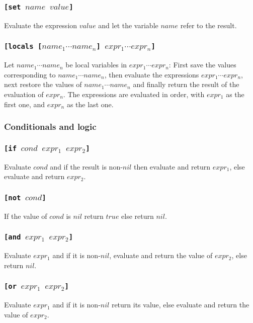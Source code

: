 \documentclass[11pt]{report}
\begin{document}
\subsubsection*{\tt{[set }$name$ $value$\tt{]}}
Evaluate the expression $value$ and let the variable $name$ refer to the result.

\subsubsection*{\tt{[locals [}$name_1 \cdots name_n$\tt{]} $expr_1 \cdots expr_n$\tt{]}}
Let $name_1 \cdots name_n$ be local variables in $expr_1 \cdots expr_n$: First save the values corresponding to $name_1 \cdots name_n$, then evaluate the expressions $expr_1 \cdots expr_n$, next restore the values of $name_1 \cdots name_n$ and finally return the result of the evaluation of $expr_n$. The expressions are evaluated in order, with $expr_1$ as the first one, and $expr_n$ as the last one.

\subsubsection{Conditionals and logic}
\subsubsection*{\tt{[if }$cond$ $expr_1$ $expr_2$\tt{]}}
Evaluate $cond$ and if the result is non-$nil$ then evaluate and return $expr_1$, else evaluate and return $expr_2$.

\subsubsection*{\tt{[not }$cond$\tt{]}}
If the value of $cond$ is $nil$ return $true$ else return $nil$.

\subsubsection*{\tt{[and }$expr_1$ $expr_2$\tt{]}}
Evaluate $expr_1$ and if it is non-$nil$, evaluate and return the value of $expr_2$, else return $nil$.

\subsubsection*{\tt{[or }$expr_1$ $expr_2$\tt{]}}
Evaluate $expr_1$ and if it is non-$nil$ return its value, else evaluate and return the value of $expr_2$.
\end{document}
